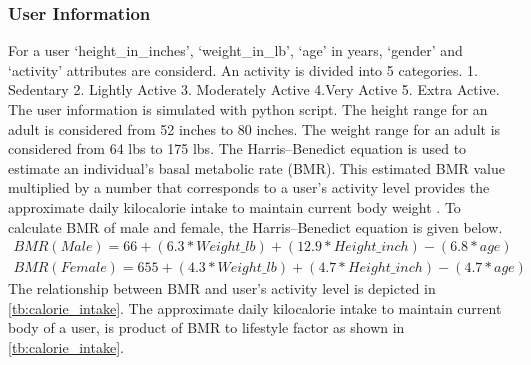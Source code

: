 \subsubsection{User Information}
\label{sec:user_info}
For a user `height\_in\_inches', `weight\_in\_lb', `age' in years, `gender' and `activity' attributes are considerd. An activity is divided into 5 categories. 1. Sedentary 2. Lightly Active 3. Moderately Active 4.Very Active 5. Extra Active. The user information is simulated with python script. The height range for an adult is considered from 52 inches to 80 inches. The weight range for an adult is considered from 64 lbs to 175 lbs. The Harris–Benedict equation is used to estimate an individual's basal metabolic rate (BMR). This estimated BMR value multiplied by a number that corresponds to a user's activity level provides the approximate daily kilocalorie intake to maintain current body weight \cite{52}. To calculate BMR of male and female, the Harris–Benedict equation is given below.
\begin{align}
BMR (Male) = 66 + (6.3 * Weight\_lb) + (12.9 * Height\_inch) - (6.8 * age) \\
BMR (Female) = 655 + (4.3 * Weight\_lb) + (4.7 * Height\_inch) - (4.7 * age)
\end{align}
The relationship between BMR and user's activity level is depicted in \autoref{tb:calorie_intake}.  The approximate daily kilocalorie intake to maintain current body of a user, is product of BMR to lifestyle factor as shown in \autoref{tb:calorie_intake}. 
